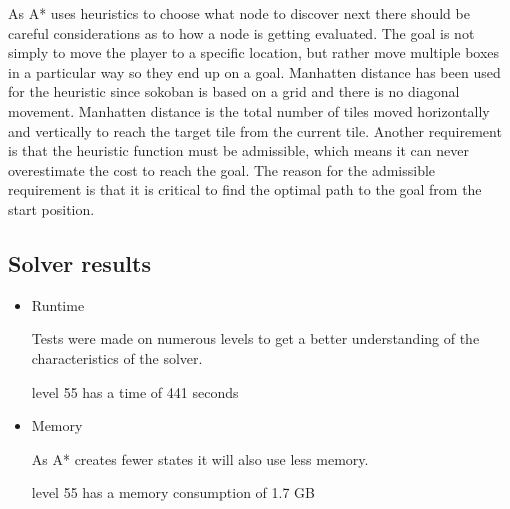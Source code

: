 \documentclass[../../maint.tex]{subfiles}
\begin{document}
As A* uses heuristics to choose what node to discover next there should be careful considerations as to how a node is 			getting evaluated. The goal is not simply to move the player to a specific location, but rather move multiple boxes in 		a particular way so they end up on a goal.
Manhatten distance has been used for the heuristic since sokoban is based on a grid and there is no diagonal movement. 			Manhatten distance is the total number of tiles moved horizontally and vertically to reach the target tile from the 			current tile. Another requirement is that the heuristic function must be admissible, which means it can never overestimate 	the cost to reach the goal. The reason for the admissible requirement is that it is critical to find the optimal path to 		the goal from the start position.

\subsection{Solver results}

 \begin{itemize}

	\item Runtime 		
 		
 	Tests were made on numerous levels to get a better understanding of the characteristics of the solver.
 		
 	level 55 has a time of 441 seconds
 		
	\item Memory
		
	As A* creates fewer states it will also use less memory. 
		
	level 55 has a memory consumption of 1.7 GB
		
 \end{itemize}
	
\end{document}
